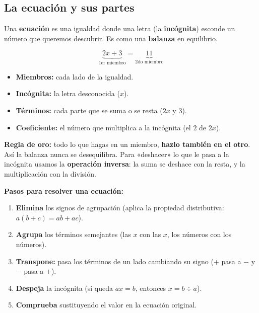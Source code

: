 \documentclass[12pt, letterpaper]{article}
\begin{document}
\subsection{La ecuación y sus partes}

Una \textbf{ecuación} es una igualdad donde una letra (la \textbf{incógnita}) esconde un número que queremos descubrir. Es como una \textbf{balanza} en equilibrio.

\begin{cuadroteoria}
  \[
    \underbrace{2x + 3}_{\text{1er miembro}} = \underbrace{11}_{\text{2do miembro}}
  \]
  \begin{itemize}[leftmargin=*]
    \item \textbf{Miembros:} cada lado de la igualdad.
    \item \textbf{Incógnita:} la letra desconocida ($x$).
    \item \textbf{Términos:} cada parte que se suma o se resta ($2x$ y $3$).
    \item \textbf{Coeficiente:} el número que multiplica a la incógnita (el $2$ de $2x$).
  \end{itemize}
\end{cuadroteoria}

\noindent\textbf{Regla de oro:} todo lo que hagas en un miembro, \textbf{hazlo también en el otro}. Así la balanza nunca se desequilibra. Para «deshacer» lo que le pasa a la incógnita usamos la \textbf{operación inversa}: la suma se deshace con la resta, y la multiplicación con la división.

\begin{cuadropasos}
  \textbf{Pasos para resolver una ecuación:}
  \begin{enumerate}
    \item \textbf{Elimina} los signos de agrupación (aplica la propiedad distributiva: $a(b + c) = ab + ac$).
    \item \textbf{Agrupa} los términos semejantes (las $x$ con las $x$, los números con los números).
    \item \textbf{Transpone:} pasa los términos de un lado cambiando su signo (+ pasa a $-$ y $-$ pasa a $+$).
    \item \textbf{Despeja} la incógnita (si queda $ax = b$, entonces $x = b \div a$).
    \item \textbf{Comprueba} sustituyendo el valor en la ecuación original.
  \end{enumerate}
\end{cuadropasos}
\end{document}
